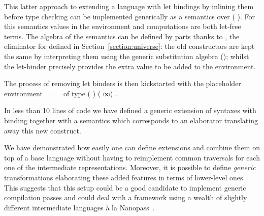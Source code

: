 This latter approach to extending a language  with let bindings
by inlining them before type checking can be implemented generically as
a semantics over (  ). For this semantics values
in the environment and computations are both let-free terms. The algebra
of the semantics can be defined by parts thanks to , the eliminator
for  defined in Section~\ref{section:universe}:
the old constructors are kept the same by
interpreting them using the generic substitution algebra ();
whilst the let-binder precisely provides the extra value to be added to the
environment.

\begin{agdasnippet}
\end{agdasnippet}

The process of removing let binders is then kickstarted with the placeholder
environment ~=~~ 
of type {( ) (  ∞) }. 

\begin{agdasnippet}
\end{agdasnippet}

In less than 10 lines of code we have defined a generic extension of
syntaxes with binding together with a semantics which corresponds
to an elaborator translating away this new construct.

We have demonstrated how easily one can define extensions and combine
them on top of a base language without having to reimplement common
traversals for each one of the intermediate representations. Moreover,
it is possible to define \emph{generic} transformations elaborating
these added features in terms of lower-level ones. This suggests that
this setup could be a good candidate to implement generic compilation
passes and could deal with a framework using a wealth of slightly
different intermediate languages à la Nanopass~\cite{Keep:2013:NFC:2544174.2500618}.
